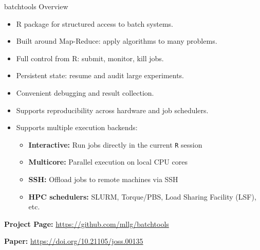 \documentclass[10pt,compress,t,notes=noshow, xcolor=table]{beamer}
\begin{document}
\begin{frame}[fragile]{batchtools Overview}
\begin{itemize}
  \item R package for structured access to batch systems.
  \item Built around Map-Reduce: apply algorithms to many problems.
  \item Full control from R: submit, monitor, kill jobs.
  \item Persistent state: resume and audit large experiments.
  \item Convenient debugging and result collection.
  \item Supports reproducibility across hardware and job schedulers.
\item Supports multiple execution backends:
\begin{itemize}
  \item \textbf{Interactive:} Run jobs directly in the current \texttt{R} session
  \item \textbf{Multicore:} Parallel execution on local CPU cores
  \item \textbf{SSH:} Offload jobs to remote machines via SSH
  \item \textbf{HPC schedulers:} SLURM, Torque/PBS, Load Sharing Facility (LSF), etc. %
\end{itemize}
\end{itemize}

\vspace{0.5em}
\textbf{Project Page:} \url{https://github.com/mllg/batchtools}

\vspace{0.5em}
\textbf{Paper:} \url{https://doi.org/10.21105/joss.00135}
\end{frame}


\end{document}
